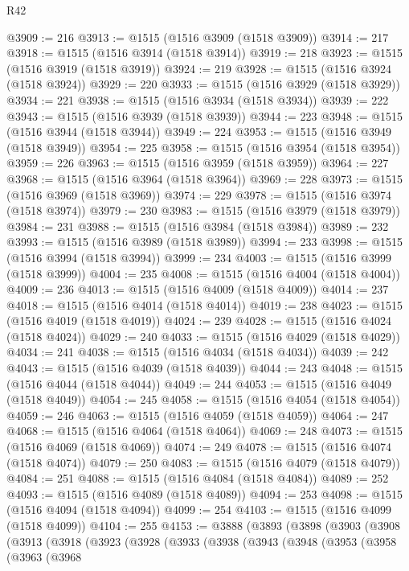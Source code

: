 \begin{lexlean}{R42}
\begin{coremodule}
{@3909 := 216
@3913 := @1515 (@1516 @3909 (@1518 @3909))
@3914 := 217
@3918 := @1515 (@1516 @3914 (@1518 @3914))
@3919 := 218
@3923 := @1515 (@1516 @3919 (@1518 @3919))
@3924 := 219
@3928 := @1515 (@1516 @3924 (@1518 @3924))
@3929 := 220
@3933 := @1515 (@1516 @3929 (@1518 @3929))
@3934 := 221
@3938 := @1515 (@1516 @3934 (@1518 @3934))
@3939 := 222
@3943 := @1515 (@1516 @3939 (@1518 @3939))
@3944 := 223
@3948 := @1515 (@1516 @3944 (@1518 @3944))
@3949 := 224
@3953 := @1515 (@1516 @3949 (@1518 @3949))
@3954 := 225
@3958 := @1515 (@1516 @3954 (@1518 @3954))
@3959 := 226
@3963 := @1515 (@1516 @3959 (@1518 @3959))
@3964 := 227
@3968 := @1515 (@1516 @3964 (@1518 @3964))
@3969 := 228
@3973 := @1515 (@1516 @3969 (@1518 @3969))
@3974 := 229
@3978 := @1515 (@1516 @3974 (@1518 @3974))
@3979 := 230
@3983 := @1515 (@1516 @3979 (@1518 @3979))
@3984 := 231
@3988 := @1515 (@1516 @3984 (@1518 @3984))
@3989 := 232
@3993 := @1515 (@1516 @3989 (@1518 @3989))
@3994 := 233
@3998 := @1515 (@1516 @3994 (@1518 @3994))
@3999 := 234
@4003 := @1515 (@1516 @3999 (@1518 @3999))
@4004 := 235
@4008 := @1515 (@1516 @4004 (@1518 @4004))
@4009 := 236
@4013 := @1515 (@1516 @4009 (@1518 @4009))
@4014 := 237
@4018 := @1515 (@1516 @4014 (@1518 @4014))
@4019 := 238
@4023 := @1515 (@1516 @4019 (@1518 @4019))
@4024 := 239
@4028 := @1515 (@1516 @4024 (@1518 @4024))
@4029 := 240
@4033 := @1515 (@1516 @4029 (@1518 @4029))
@4034 := 241
@4038 := @1515 (@1516 @4034 (@1518 @4034))
@4039 := 242
@4043 := @1515 (@1516 @4039 (@1518 @4039))
@4044 := 243
@4048 := @1515 (@1516 @4044 (@1518 @4044))
@4049 := 244
@4053 := @1515 (@1516 @4049 (@1518 @4049))
@4054 := 245
@4058 := @1515 (@1516 @4054 (@1518 @4054))
@4059 := 246
@4063 := @1515 (@1516 @4059 (@1518 @4059))
@4064 := 247
@4068 := @1515 (@1516 @4064 (@1518 @4064))
@4069 := 248
@4073 := @1515 (@1516 @4069 (@1518 @4069))
@4074 := 249
@4078 := @1515 (@1516 @4074 (@1518 @4074))
@4079 := 250
@4083 := @1515 (@1516 @4079 (@1518 @4079))
@4084 := 251
@4088 := @1515 (@1516 @4084 (@1518 @4084))
@4089 := 252
@4093 := @1515 (@1516 @4089 (@1518 @4089))
@4094 := 253
@4098 := @1515 (@1516 @4094 (@1518 @4094))
@4099 := 254
@4103 := @1515 (@1516 @4099 (@1518 @4099))
@4104 := 255
@4153 := @3888
    (@3893
      (@3898
        (@3903
          (@3908
            (@3913
              (@3918
                (@3923
                  (@3928
                    (@3933
                      (@3938
                        (@3943
                          (@3948
                            (@3953
                              (@3958
                                (@3963
                                  (@3968
}
\end{coremodule}
\end{lexlean}
